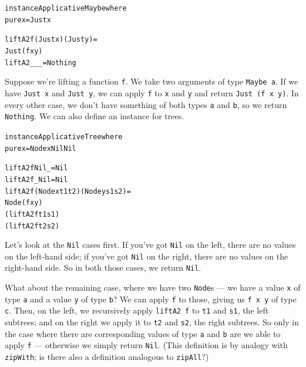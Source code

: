 \begin{alltt}
instance Applicative Maybe where
  pure x = Just x

  liftA2 f (Just x) (Just y) =
    Just (f x y)
  liftA2 _ _ _ = Nothing
\end{alltt}
Suppose we're lifting a function \texttt{f}. We take two arguments of type \texttt{Maybe a}. If we have \texttt{Just x} and \texttt{Just y}, we can apply \texttt{f} to \texttt{x} and \texttt{y} and return \texttt{Just (f x y)}. In every other case, we don't have something of both types \texttt{a} and \texttt{b}, so we return \texttt{Nothing}.
We can also define an instance for trees. 
\begin{alltt}
instance Applicative Tree where
  pure x = Node x Nil Nil

  liftA2 f Nil _ = Nil
  liftA2 f _ Nil = Nil
  liftA2 f (Node x t1 t2) (Node y s1 s2) =
    Node (f x y)
         (liftA2 f t1 s1)
         (liftA2 f t2 s2)
\end{alltt}
Let's look at the \texttt{Nil} cases first.
If you've got \texttt{Nil} on the left, there are no values on the left-hand side; if you've got \texttt{Nil} on the right, there are no values on the right-hand side. So in both those cases, we return \texttt{Nil}.

What about the remaining case, where we have two \texttt{Node}s — we have a value \texttt{x} of type \texttt{a} and a value \texttt{y} of type \texttt{b}? We can apply \texttt{f} to those, giving us \texttt{f x y} of type \texttt{c}. Then, on the left, we recursively apply \texttt{liftA2 f} to \texttt{t1} and \texttt{s1}, the left subtrees; and on the right we apply it to \texttt{t2} and \texttt{s2}, the right subtrees. So only in the case where there are corresponding values of type \texttt{a} and \texttt{b} are we able to apply \texttt{f} — otherwise we simply return \texttt{Nil}. (This definition is by analogy with \texttt{zipWith}; is there also a definition analogous to \texttt{zipAll}?)

